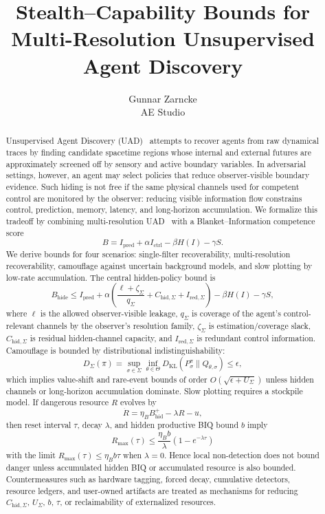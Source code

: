 \documentclass[10pt]{article}
\title{\vspace{-1.6em}Stealth--Capability Bounds for Multi-Resolution Unsupervised Agent Discovery}
\author{Gunnar Zarncke\\AE Studio}
\date{\vspace{-0.8em}}
\newcommand{\KL}{D_{\mathrm{KL}}}
\begin{document}
\maketitle

\begin{abstract}
Unsupervised Agent Discovery (UAD)~\cite{uad2025} attempts to recover agents from raw dynamical traces by finding candidate spacetime regions whose internal and external futures are approximately screened off by sensory and active boundary variables. In adversarial settings, however, an agent may select policies that reduce observer-visible boundary evidence. Such hiding is not free if the same physical channels used for competent control are monitored by the observer: reducing visible information flow constrains control, prediction, memory, latency, and long-horizon accumulation. We formalize this tradeoff by combining multi-resolution UAD~\cite{zarncke2026smoothing} with a Blanket--Information competence score~\cite{biq2025}
\[
B
=
I_{\mathrm{pred}}
+
\alpha I_{\mathrm{ctrl}}
-
\beta H(I)
-
\gamma S.
\]
We derive bounds for four scenarios: single-filter recoverability, multi-resolution recoverability, camouflage against uncertain background models, and slow plotting by low-rate accumulation. The central hidden-policy bound is
\[
B_{\mathrm{hide}}
\le
I_{\mathrm{pred}}
+
\alpha\left(
\frac{\ell+\zeta_\Sigma}{q_\Sigma}
+
C_{\mathrm{hid},\Sigma}
+
I_{\mathrm{red},\Sigma}
\right)
-
\beta H(I)
-
\gamma S,
\]
where \(\ell\) is the allowed observer-visible leakage, \(q_\Sigma\) is coverage of the agent's control-relevant channels by the observer's resolution family, \(\zeta_\Sigma\) is estimation/coverage slack, \(C_{\mathrm{hid},\Sigma}\) is residual hidden-channel capacity, and \(I_{\mathrm{red},\Sigma}\) is redundant control information. Camouflage is bounded by distributional indistinguishability:
\[
D_\Sigma(\pi)
=
\sup_{\sigma\in\Sigma}
\inf_{\theta\in\Theta}
\KL(P^\pi_\sigma\|Q_{\theta,\sigma})
\le \epsilon,
\]
which implies value-shift and rare-event bounds of order \(O(\sqrt{\epsilon+U_\Sigma})\) unless hidden channels or long-horizon accumulation dominate. Slow plotting requires a stockpile model. If dangerous resource \(R\) evolves by
\[
\dot R
=
\eta_B B_{\mathrm{hid}}^+
-
\lambda R
-
u,
\]
then reset interval \(\tau\), decay \(\lambda\), and hidden productive BIQ bound \(b\) imply
\[
R_{\max}(\tau)
\le
\frac{\eta_B b}{\lambda}(1-e^{-\lambda\tau})
\]
with the limit \(R_{\max}(\tau)\le \eta_B b\tau\) when \(\lambda=0\). Hence local non-detection does not bound danger unless accumulated hidden BIQ or accumulated resource is also bounded. Countermeasures such as hardware tagging, forced decay, cumulative detectors, resource ledgers, and user-owned artifacts are treated as mechanisms for reducing \(C_{\mathrm{hid},\Sigma}\), \(U_\Sigma\), \(b\), \(\tau\), or reclaimability of externalized resources.
\end{abstract}
\end{document}
